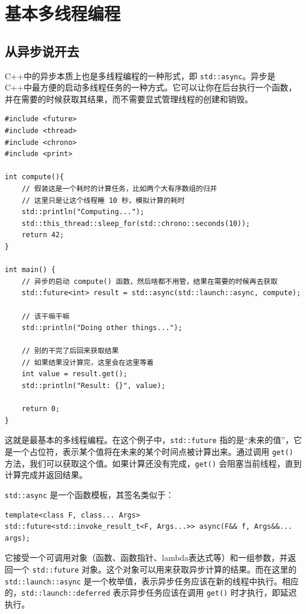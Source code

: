 \section{基本多线程编程}

\subsection{从异步说开去}

C++中的异步本质上也是多线程编程的一种形式，即 \verb|std::async|。异步是C++中最方便的启动多线程任务的一种方式。它可以让你在后台执行一个函数，并在需要的时候获取其结果，而不需要显式管理线程的创建和销毁。

\begin{verbatim}
#include <future>
#include <thread>
#include <chrono>
#include <print>

int compute(){
    // 假装这是一个耗时的计算任务，比如两个大有序数组的归并
    // 这里只是让这个线程睡 10 秒，模拟计算的耗时
    std::println("Computing...");
    std::this_thread::sleep_for(std::chrono::seconds(10));
    return 42;
}

int main() {
    // 异步的启动 compute() 函数，然后啥都不用管，结果在需要的时候再去获取
    std::future<int> result = std::async(std::launch::async, compute);

    // 该干嘛干嘛
    std::println("Doing other things...");

    // 别的干完了后回来获取结果
    // 如果结果没计算完，这里会在这里等着
    int value = result.get();
    std::println("Result: {}", value);

    return 0;
}
\end{verbatim}

这就是最基本的多线程编程。在这个例子中，\verb|std::future| 指的是“未来的值”，它是一个占位符，表示某个值将在未来的某个时间点被计算出来。通过调用 \verb|get()| 方法，我们可以获取这个值。如果计算还没有完成，\verb|get()| 会阻塞当前线程，直到计算完成并返回结果。

\texttt{std::async} 是一个函数模板，其签名类似于：
\begin{verbatim}
template<class F, class... Args>
std::future<std::invoke_result_t<F, Args...>> async(F&& f, Args&&... args);
\end{verbatim}
它接受一个可调用对象（函数、函数指针、lambda表达式等）和一组参数，并返回一个 \verb|std::future| 对象。这个对象可以用来获取异步计算的结果。而在这里的\verb|std::launch::async| 是一个枚举值，表示异步任务应该在新的线程中执行。相应的，\verb|std::launch::deferred| 表示异步任务应该在调用 \verb|get()| 时才执行，即延迟执行。

